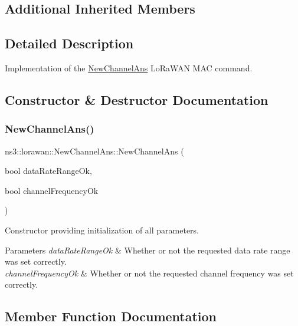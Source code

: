 \subsection*{Additional Inherited Members}


\subsection{Detailed Description}
Implementation of the \hyperlink{classns3_1_1lorawan_1_1NewChannelAns}{New\+Channel\+Ans} Lo\+Ra\+W\+AN M\+AC command. 

\subsection{Constructor \& Destructor Documentation}
\mbox{\label{classns3_1_1lorawan_1_1NewChannelAns_adb8afb397b3b9db5713a12e037197136}} 
\subsubsection{\texorpdfstring{New\+Channel\+Ans()}{NewChannelAns()}}
{\footnotesize\ttfamily ns3\+::lorawan\+::\+New\+Channel\+Ans\+::\+New\+Channel\+Ans (\begin{DoxyParamCaption}\item[{bool}]{data\+Rate\+Range\+Ok,  }\item[{bool}]{channel\+Frequency\+Ok }\end{DoxyParamCaption})}

Constructor providing initialization of all parameters.


\begin{DoxyParams}{Parameters}
{\em data\+Rate\+Range\+Ok} & Whether or not the requested data rate range was set correctly. \\
\hline
{\em channel\+Frequency\+Ok} & Whether or not the requested channel frequency was set correctly. \\
\hline
\end{DoxyParams}


\subsection{Member Function Documentation}
\mbox{\label{classns3_1_1lorawan_1_1NewChannelAns_ae77b621e4111235558df52fd6cbff0aa}} 
